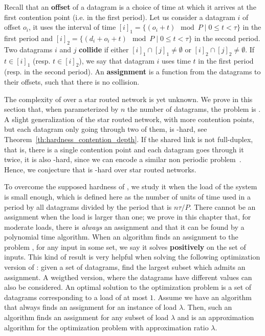  Recall that an \textbf{offset} of a datagram is a choice of time at which it arrives
 at the first contention point (i.e. in the first period). Let us consider a datagram $i$
 of offset $o_i$, it uses the interval of time $[i]_1 = \{ (o_i + t) \mod P \mid 0 \leq t < \tau \}$ in the first period and $[i]_2 = \{ (d_i + o_i + t) \mod P \mid 0 \leq t < \tau \}$ in the second period. Two datagrams $i$ and $j$ \textbf{collide} if either $[i]_1 \cap [j]_1 \neq \emptyset $ or $[i]_2 \cap [j]_2 \neq \emptyset $. If $t \in [i]_1$ (resp. $t \in [i]_2$), we say that datagram $i$ uses time $t$ in the first period (resp. in the second period). An \textbf{assignment} is a function from the datagrams to their offsets, such that there is no collision.


The complexity of \pazl over a star routed network is yet unknown. We prove in this section that, when parameterized by
$n$ the number of datagrams, the problem is \FPT. A slight generalization of the star routed network, with more contention points, but each datagram only going through two of them, is \NP-hard, see Theorem~\ref{th:hardness_contention_depth}. If the shared link is not full-duplex, that is, there is a single contention point and each datagram goes through it twice, it is also \NP-hard, since we can encode a similar non periodic problem~\cite{orman1997complexity}. Hence, we conjecture that \pazl is \NP-hard over star routed networks.

To overcome the supposed hardness of \pazl, we study it when the load of the system is small enough, which is defined here as
the number of units of time used in a period by all datagrams divided by the period that is $n\tau /P$. There cannot be an assignment when the load is larger than one; we prove in this chapter that, for moderate loads, there is \emph{always} an assignment and that it can be found by a polynomial time algorithm. When an algorithm finds an assignment to the problem \pazl, for any input in some set, we say it solves \pazl \textbf{positively} on the set of inputs. This kind of result is very helpful when solving the following optimization version of \pazl: given a set of datagrams, find the largest subset which admits an assignment. A weigthed version, where the datagrams have different values can also be considered. An optimal solution to the optimization problem is a set of datagrams corresponding to a load of at most $1$. Assume we have an algorithm that always finds an assignment for an instance of load $\lambda$. Then, such an algorithm finds an assignment for any subset of load $\lambda$ and is an approximation algorithm for the optimization problem with approximation ratio $\lambda$.


